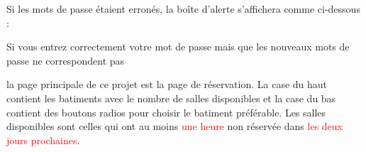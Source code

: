 \documentclass{article}
\begin{document}
\begin{enumerate}
 
  Si les mots de passe étaient erronés, la boîte d'alerte s'affichera comme ci-dessous :
  
   
  \vspace{0.7cm}
   
\hspace*{-0.7in}

               \noindent{}  
               
  
  
  Si vous entrez correctement votre mot de passe mais que les nouveaux mots de passe ne correspondent pas
  \vspace{0.7cm}
   
\hspace*{-0.7in}

               \noindent{}  
               
  
  la page principale de ce projet est la page de réservation. La case du haut contient les batiments avec le nombre de salles disponibles et la case du bas contient des boutons radios  pour choisir le batiment préférable. Les salles disponibles sont celles qui ont au moins \textcolor{red}{une heure} non réservée dans \textcolor{red}{les deux jours prochaines}.
  

\end{enumerate}
\end{document}
